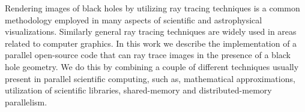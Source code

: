 Rendering images of black holes by utilizing ray tracing techniques is a common
methodology employed in many aspects of scientific and astrophysical visualizations.
Similarly general ray tracing techniques are widely used in areas related to computer graphics.
In this work we describe the implementation of a parallel open-source code that can ray trace images in the presence of a black hole geometry.
We do this by combining a couple of different techniques usually present in parallel scientific computing,
such as, mathematical approximations, utilization of scientific libraries, shared-memory and distributed-memory parallelism.

